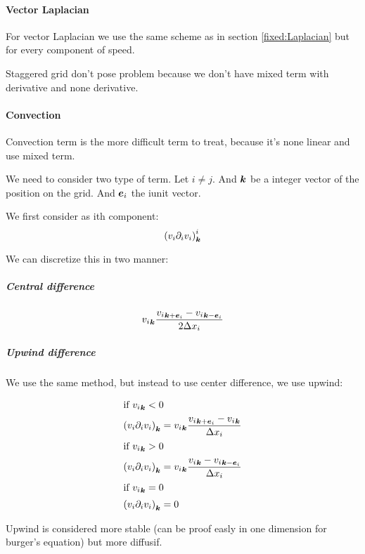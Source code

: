 \paragraph{Vector Laplacian}
For vector Laplacian we use the same scheme as in section \ref{fixed:Laplacian} but for every component of speed.

Staggered grid don't pose problem because we don't have mixed term with derivative and none derivative.

\paragraph{Convection}

Convection term is the more difficult term to treat, because it's none linear and use mixed term.

We need to consider two type of term. Let $i\neq j$. And ${\boldsymbol {k}}$ be a integer vector of the position on the grid.
And ${\boldsymbol {e}}_i$ the i\th unit vector.

We first consider as ith component:
\begin{equation}
\left(v_{i}\partial_{i}v_{i}\right)^{i}_{{\boldsymbol {k}}}
\end{equation}

We can discretize this in two manner:

\subparagraph{Central difference}
\begin{equation}
{v_{i}}_{{\boldsymbol {k}}}\frac{{v_{i}}_{{\boldsymbol {k}}+{\boldsymbol {e}}_i}-{v_{i}}_{{\boldsymbol {k}}-{\boldsymbol {e}}_i}}{2\Delta x_{i}}
\end{equation}

\subparagraph{Upwind difference}

We use the same method, but instead to use center difference, we use upwind:

\begin{align}
\intertext{if ${v_{i}}_{{\boldsymbol {k}}}<0$}
\left(v_{i}\partial_{i}v_{i}\right)_{{\boldsymbol {k}}}&={v_{i}}_{{\boldsymbol {k}}}\frac{{v_{i}}_{{\boldsymbol {k}}+{\boldsymbol {e}}_i}-{v_{i}}_{{\boldsymbol {k}}}}{\Delta x_{i}}\\
\intertext{if ${v_{i}}_{{\boldsymbol {k}}}>0$}
\left(v_{i}\partial_{i}v_{i}\right)_{{\boldsymbol {k}}}&={v_{i}}_{{\boldsymbol {k}}}\frac{{v_{i}}_{{\boldsymbol {k}}}-{v_{i}}_{{\boldsymbol {k}}-{\boldsymbol {e}}_i}}{\Delta x_{i}}\\
\intertext{if ${v_{i}}_{{\boldsymbol {k}}}=0$}
\left(v_{i}\partial_{i}v_{i}\right)_{{\boldsymbol {k}}}&=0
\end{align}

Upwind is considered more stable (can be proof easly in one dimension for burger's equation) but more diffusif.

